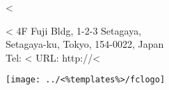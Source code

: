 \parbox[t]{.50\textwidth}{
\vspace{0.3cm}
<%
}
\parbox[t]{.38\textwidth}{
\vspace{0.3cm}
	{\Large <%
	 \normalsize 4F Fuji Bldg, 1-2-3 Setagaya, \\
	 Setagaya-ku, Tokyo, 154-0022, Japan \\
   Tel: <%
   URL: http://<%
	 }
}
\parbox[t]{.10\textwidth}{
\vspace{0.2cm}
   \texttt{[image: ../<\%templates\%>/fclogo]}
}
